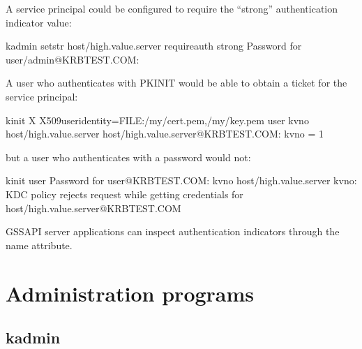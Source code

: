 \documentclass[letterpaper,10pt,english]{sphinxmanual}
\begin{document}
A service principal could be configured to require the “strong”
authentication indicator value:

%
\begin{sphinxVerbatim}[commandchars=\\\{\}]
\PYGZdl{} kadmin setstr host/high.value.server require\PYGZus{}auth strong
Password for user/admin@KRBTEST.COM:
\end{sphinxVerbatim}

A user who authenticates with PKINIT would be able to obtain a ticket
for the service principal:

%
\begin{sphinxVerbatim}[commandchars=\\\{\}]
\PYGZdl{} kinit \PYGZhy{}X X509\PYGZus{}user\PYGZus{}identity=FILE:/my/cert.pem,/my/key.pem user
\PYGZdl{} kvno host/high.value.server
host/high.value.server@KRBTEST.COM: kvno = 1
\end{sphinxVerbatim}

but a user who authenticates with a password would not:

%
\begin{sphinxVerbatim}[commandchars=\\\{\}]
\PYGZdl{} kinit user
Password for user@KRBTEST.COM:
\PYGZdl{} kvno host/high.value.server
kvno: KDC policy rejects request while getting credentials for
  host/high.value.server@KRBTEST.COM
\end{sphinxVerbatim}

GSSAPI server applications can inspect authentication indicators
through the  name
attribute.


\chapter{Administration  programs}
\label{\detokenize{admin/admin_commands/index:administration-programs}}\label{\detokenize{admin/admin_commands/index::doc}}

\section{kadmin}
\label{\detokenize{admin/admin_commands/kadmin_local::doc}}\label{\detokenize{admin/admin_commands/kadmin_local:kadmin}}\label{\detokenize{admin/admin_commands/kadmin_local:kadmin-1}}
\end{document}
